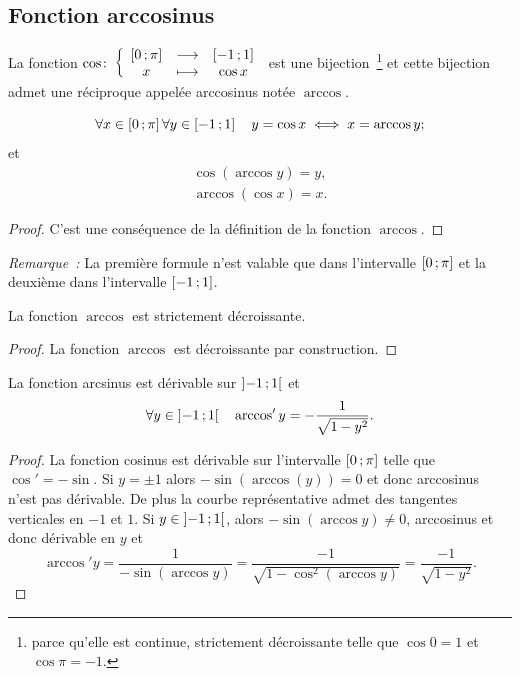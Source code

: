 \subsection{Fonction arccosinus}
\label{subsec:chap1-fonctionarccos}
\begin{defdef}
  La fonction \(\cos\colon \left\{\begin{array}{ccc} \left[ 0 \, ;  \pi \right] & \longrightarrow &\left[ -1 \, ;  1 \right]\\ x & \longmapsto & \cos x \end{array} \right.\) est une bijection~\footnote{parce qu'elle est continue, strictement décroissante telle que \(\cos 0=1\) et \(\cos \pi=-1\).} et cette bijection admet une réciproque appelée arccosinus notée \(\arccos\).
\end{defdef}
%
\begin{prop}
  \begin{equation}
    \forall x \in \left[ 0 \, ;  \pi \right] \forall y \in \left[ -1 \, ;  1 \right] \quad y = \cos x \iff x = \arccos y;
  \end{equation}
  et
  \begin{gather}
    \cos(\arccos y) = y, \\
    \arccos(\cos x) = x.
  \end{gather}
\end{prop}
\begin{proof}
  C'est une conséquence de la définition de la fonction \(\arccos\).
\end{proof}
%
\emph{Remarque~:} La première formule n'est valable que dans l'intervalle \(\left[ 0 \, ;  \pi \right]\) et la deuxième dans l'intervalle \(\left[ -1 \, ;  1 \right]\).
\begin{prop}
  La fonction \(\arccos\) est strictement décroissante.
\end{prop}
\begin{proof}
  La fonction \(\arccos\) est décroissante par construction.
\end{proof}
%
\begin{prop}
  La fonction arcsinus est dérivable sur \(\left] -1 \, ;  1 \right[\) et
  \begin{equation}
    \forall y \in \left] -1 \, ;  1 \right[ \quad \arccos'y = -\frac{1}{\sqrt{1-y^2}}.
  \end{equation}
\end{prop}
\begin{proof}
  La fonction cosinus est dérivable sur l'intervalle \(\left[ 0 \, ;  \pi \right]\) telle que \(\cos'=-\sin\). Si \(y=\pm 1\) alors \(-\sin(\arccos(y))=0\)  et donc arccosinus n'est pas dérivable. De plus la courbe représentative admet des tangentes verticales en \(-1\) et \(1\). Si \(y \in \left] -1 \, ;  1 \right[\), alors \(-\sin(\arccos y) \neq 0\), arccosinus et donc dérivable en \(y\) et
  \begin{equation}
    \arccos' y = \frac{1}{-\sin( \arccos y)}=\frac{-1}{\sqrt{1-\cos^2(\arccos y)}}=\frac{-1}{\sqrt{1-y^2}}.
  \end{equation}
\end{proof}
